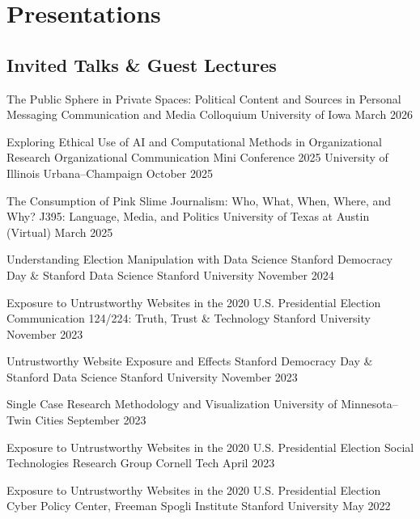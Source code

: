 \section{Presentations}

\subsection{Invited Talks \& Guest Lectures}

\cvtalk
  {The Public Sphere in Private Spaces: Political Content and Sources in Personal Messaging}
  {Communication and Media Colloquium}
  {University of Iowa}
  {March 2026}

\cvtalk
  {Exploring Ethical Use of AI and Computational Methods in Organizational Research}
  {Organizational Communication Mini Conference 2025}
  {University of Illinois Urbana--Champaign}
  {October 2025}

\cvtalk
  {The Consumption of Pink Slime Journalism: Who, What, When, Where, and Why?}
  {J395: Language, Media, and Politics}
  {University of Texas at Austin (Virtual)}
  {March 2025}

\cvtalk
  {Understanding Election Manipulation with Data Science}
  {Stanford Democracy Day \& Stanford Data Science}
  {Stanford University}
  {November 2024}

\cvtalk
  {Exposure to Untrustworthy Websites in the 2020 U.S. Presidential Election}
  {Communication 124/224: Truth, Trust \& Technology}
  {Stanford University}
  {November 2023}

\cvtalk
  {Untrustworthy Website Exposure and Effects}
  {Stanford Democracy Day \& Stanford Data Science}
  {Stanford University}
  {November 2023}

\cvtalk
  {Single Case Research Methodology and Visualization}
  {}
  {University of Minnesota--Twin Cities}
  {September 2023}

\cvtalk
  {Exposure to Untrustworthy Websites in the 2020 U.S. Presidential Election}
  {Social Technologies Research Group}
  {Cornell Tech}
  {April 2023}

\cvtalk
  {Exposure to Untrustworthy Websites in the 2020 U.S. Presidential Election}
  {Cyber Policy Center, Freeman Spogli Institute}
  {Stanford University}
  {May 2022}


